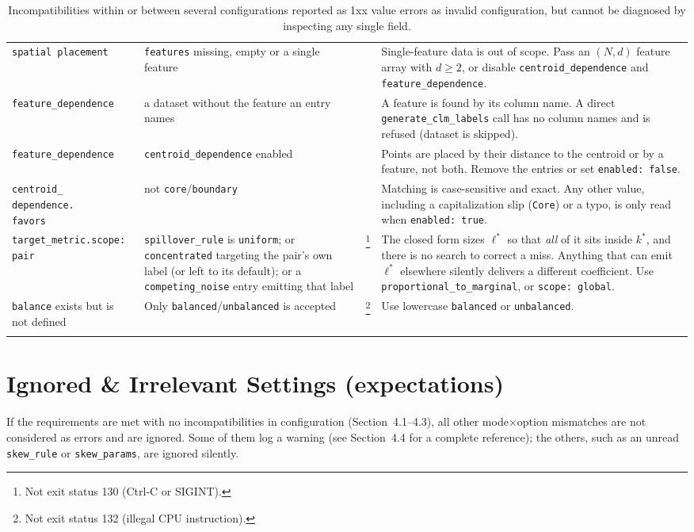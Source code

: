 \documentclass[a4paper,11pt]{article}
\newcommand{\vcode}[1]{\textcolor{valred}{\bfseries\ttfamily #1}}
\begin{document}
\begin{longtable}{@{}L{3.4cm} L{4.6cm} L{1.2cm} L{6.4cm}@{}}
\texttt{spatial placement} & \texttt{features} missing, empty or a single feature & \vcode{125} & Single-feature data is out of scope. Pass an $(N,d)$ feature array with $d \ge 2$, or disable \texttt{centroid\_dependence} and \texttt{feature\_dependence}. \\
\texttt{feature\_dependence} & a dataset without the feature an entry names & \vcode{125} & A feature is found by its column name. A direct \texttt{generate\_clm\_labels} call has no column names and is refused (dataset is skipped). \\
\texttt{feature\_dependence} & \texttt{centroid\_dependence} enabled & \vcode{141} & Points are placed by their distance to the centroid or by a feature, not both. Remove the entries or set \texttt{enabled: false}. \\
\texttt{centroid\_\newline dependence.\newline favors} & not \texttt{core}/\texttt{boundary} & \vcode{129} &  Matching is case-sensitive and exact. Any other value, including a capitalization slip (\texttt{Core}) or a typo, is only read when \texttt{enabled: true}. \\
\texttt{target\_metric.}\newline \texttt{scope: pair} & \texttt{spillover\_rule} is \texttt{uniform}; or \texttt{concentrated} targeting the pair's own label (or left to its default); or a \texttt{competing\_noise} entry emitting that label & \vcode{130}\footnote{Not exit status 130 (Ctrl-C or SIGINT).}  & The closed form sizes $\ell^*$ so that \emph{all} of it sits inside $k^*$, and there is no search to correct a miss. Anything that can emit $\ell^*$ elsewhere silently delivers a different coefficient. Use \texttt{proportional\_to\_marginal}, or \texttt{scope: global}. \\
\texttt{balance} exists but is not defined & Only \texttt{balanced}/\texttt{unbalanced} is accepted & \vcode{132}\footnote{Not exit status 132 (illegal CPU instruction).} & Use lowercase \texttt{balanced} or \texttt{unbalanced}. \\
\bottomrule
\caption{Incompatibilities within or between several configurations reported as 1xx value errors as invalid configuration, but cannot be diagnosed by inspecting any single field.}
\end{longtable}
\label{1xx-shorttable}

\section{Ignored \& Irrelevant Settings (expectations)}
If the requirements are met with no incompatibilities in configuration (Section~4.1--4.3), all other mode$\times$option mismatches are not considered as errors and are ignored. Some of them log a warning (see Section~4.4 for a complete reference); the others, such as an unread \texttt{skew\_rule} or \texttt{skew\_params}, are ignored silently.
\end{document}
